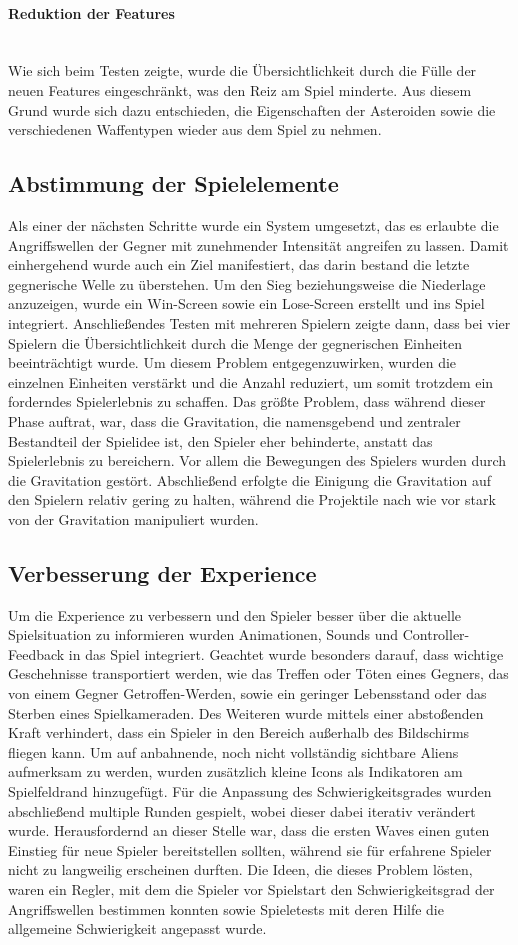 \documentclass[11pt]{scrartcl}
\newcommand{\lbparagraph}[1]{\paragraph*{#1}\mbox{}\\}
\begin{document}
\lbparagraph{Reduktion der Features}
Wie sich beim Testen zeigte, wurde die Übersichtlichkeit durch die Fülle der neuen Features eingeschränkt, was den Reiz am Spiel minderte. Aus diesem Grund wurde sich dazu entschieden, die Eigenschaften der Asteroiden sowie die verschiedenen Waffentypen wieder aus dem Spiel zu nehmen.

\subsection{Abstimmung der Spielelemente}
Als einer der nächsten Schritte wurde ein System umgesetzt, das es erlaubte die Angriffswellen der Gegner mit zunehmender Intensität angreifen zu lassen. Damit einhergehend wurde auch ein Ziel manifestiert, das darin bestand die letzte gegnerische Welle zu überstehen. Um den Sieg beziehungsweise die Niederlage anzuzeigen, wurde ein Win-Screen sowie ein Lose-Screen erstellt und ins Spiel integriert.
Anschließendes Testen mit mehreren Spielern zeigte dann, dass bei vier Spielern die Übersichtlichkeit durch die Menge der gegnerischen Einheiten beeinträchtigt wurde. Um diesem Problem entgegenzuwirken, wurden die einzelnen Einheiten verstärkt und die Anzahl reduziert, um somit trotzdem ein forderndes Spielerlebnis zu schaffen.
Das größte Problem, dass während dieser Phase auftrat, war, dass die Gravitation, die namensgebend und zentraler Bestandteil der Spielidee ist, den Spieler eher behinderte, anstatt das Spielerlebnis zu bereichern. Vor allem die Bewegungen des Spielers wurden durch die Gravitation gestört. Abschließend erfolgte die Einigung die Gravitation auf den Spielern relativ gering zu halten, während die Projektile nach wie vor stark von der Gravitation manipuliert wurden.

\subsection{Verbesserung der Experience}
Um die Experience zu verbessern und den Spieler besser über die aktuelle Spielsituation zu informieren wurden Animationen, Sounds und Controller-Feedback in das Spiel integriert. Geachtet wurde besonders darauf, dass wichtige Geschehnisse transportiert werden, wie das Treffen oder Töten eines Gegners, das von einem Gegner Getroffen-Werden, sowie ein geringer Lebensstand oder das Sterben eines Spielkameraden. Des Weiteren wurde mittels einer abstoßenden Kraft verhindert, dass ein Spieler in den Bereich außerhalb des Bildschirms fliegen kann. Um auf anbahnende, noch nicht vollständig sichtbare Aliens aufmerksam zu werden, wurden zusätzlich kleine Icons als Indikatoren am Spielfeldrand hinzugefügt.
Für die Anpassung des Schwierigkeitsgrades wurden abschließend multiple Runden gespielt, wobei dieser dabei iterativ verändert wurde. Herausfordernd an dieser Stelle war, dass die ersten Waves einen guten Einstieg für neue Spieler bereitstellen sollten, während sie für erfahrene Spieler nicht zu langweilig erscheinen durften. Die Ideen, die dieses Problem lösten, waren ein Regler, mit dem die Spieler vor Spielstart den Schwierigkeitsgrad der Angriffswellen bestimmen konnten sowie Spieletests mit deren Hilfe die allgemeine Schwierigkeit angepasst wurde.
\end{document}
